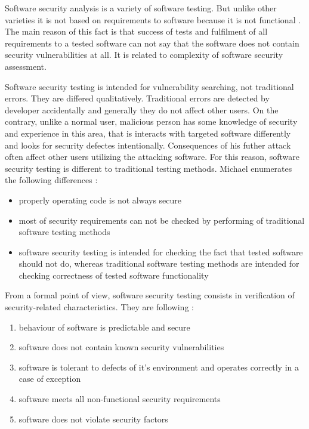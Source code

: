%
Software security analysis is a variety of software testing. 
%
But unlike other varieties it is not based on requirements to software because it is not functional . 
%
The main reason of this fact is that success of tests and fulfilment of all requirements to a tested software can not say that the software does not contain security vulnerabilities at all. 
%
It is related to complexity of software security assessment. 

%
Software security testing is intended for vulnerability searching, not traditional errors. 
%
They are differed qualitatively. 
%
Traditional errors are detected by developer accidentally and generally they do not affect other users. 
%
On the contrary, unlike a normal user, \A malicious person has some knowledge of security and experience in this area, that is interacts with targeted software differently and looks for security defectes intentionally. 
%
Consequences of his futher attack often affect other users utilizing the attacking software. 
%
For this reason, software security testing is different to traditional testing methods. 
%
Michael enumerates the following differences : 
\begin{itemize}
	\setlength{\itemsep}{0pt}%

	\item properly operating code is not always secure
	\item most of security requirements can not be checked by performing of traditional software testing methods
	\item software security testing is intended for checking the fact that tested software should not do, whereas traditional software testing methods are intended for checking correctness of tested software functionality
\end{itemize}

%
From a formal point of view, software security testing consists in verification of security-related characteristics. 
%
They are following : 
\begin{enumerate}
	\setlength{\itemsep}{0pt}%

	\item behaviour of software is predictable and secure
	\item software does not contain known security vulnerabilities
	\item software is tolerant to defects of it's environment and operates correctly in a case of exception
	\item software meets all non-functional security requirements
	\item software does not violate security factors
\end{enumerate}


